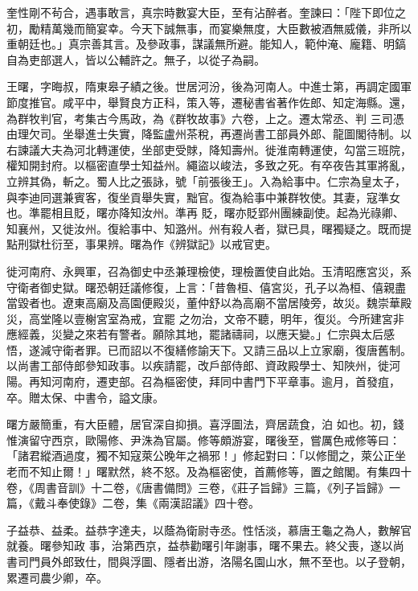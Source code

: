 \begin{pinyinscope}
 奎性剛不茍合，遇事敢言，真宗時數宴大臣，至有沾醉者。奎諫曰：「陛下即位之
 初，勵精萬幾而簡宴幸。今天下誠無事，而宴樂無度，大臣數被酒無威儀，非所以重朝廷也。」真宗善其言。及參政事，謀議無所避。能知人，範仲淹、龐籍、明鎬自為吏部選人，皆以公輔許之。無子，以從子為嗣。



 王曙，字晦叔，隋東皋子績之後。世居河汾，後為河南人。中進士第，再調定國軍節度推官。咸平中，舉賢良方正科，策入等，遷秘書省著作佐郎、知定海縣。還，為群牧判官，考集古今馬政，為《群牧故事》六卷，上之。遷太常丞、判
 三司憑由理欠司。坐舉進士失實，降監盧州茶稅，再遷尚書工部員外郎、龍圖閣待制。以右諫議大夫為河北轉運使，坐部吏受賕，降知壽州。徙淮南轉運使，勾當三班院，權知開封府。以樞密直學士知益州。繩盜以峻法，多致之死。有卒夜告其軍將亂，立辨其偽，斬之。蜀人比之張詠，號「前張後王」。入為給事中。仁宗為皇太子，與李迪同選兼賓客，復坐貢舉失實，黜官。復為給事中兼群牧使。其妻，寇準女也。準罷相且貶，曙亦降知汝州。準再
 貶，曙亦貶郢州團練副使。起為光祿卿、知襄州，又徙汝州。復給事中、知潞州。州有殺人者，獄已具，曙獨疑之。既而提點刑獄杜衍至，事果辨。曙為作《辨獄記》以戒官吏。



 徙河南府、永興軍，召為御史中丞兼理檢使，理檢置使自此始。玉清昭應宮災，系守衛者御史獄。曙恐朝廷議修復，上言：「昔魯桓、僖宮災，孔子以為桓、僖親盡當毀者也。遼東高廟及高園便殿災，董仲舒以為高廟不當居陵旁，故災。魏崇華殿災，高堂隆以壹榭宮室為戒，宜罷
 之勿治，文帝不聽，明年，復災。今所建宮非應經義，災變之來若有警者。願除其地，罷諸禱祠，以應天變。」仁宗與太后感悟，遂減守衛者罪。已而詔以不復繕修諭天下。又請三品以上立家廟，復唐舊制。以尚書工部侍郎參知政事。以疾請罷，改戶部侍郎、資政殿學士、知陜州，徙河陽。再知河南府，遷吏部。召為樞密使，拜同中書門下平章事。逾月，首發疽，卒。贈太保、中書令，謚文康。



 曙方嚴簡重，有大臣體，居官深自抑損。喜浮圖法，齊居蔬食，泊
 如也。初，錢惟演留守西京，歐陽修、尹洙為官屬。修等頗游宴，曙後至，嘗厲色戒修等曰：「諸君縱酒過度，獨不知寇萊公晚年之禍邪！」修起對曰：「以修聞之，萊公正坐老而不知止爾！」曙默然，終不怒。及為樞密使，首薦修等，置之館閣。有集四十卷，《周書音訓》十二卷，《唐書備問》三卷，《莊子旨歸》三篇，《列子旨歸》一篇，《戴斗奉使錄》二卷，集《兩漢詔議》四十卷。



 子益恭、益柔。益恭字達夫，以蔭為衛尉寺丞。性恬淡，慕唐王龜之為人，數解官就養。曙參知政
 事，治第西京，益恭勸曙引年謝事，曙不果去。終父喪，遂以尚書司門員外郎致仕，間與浮圖、隱者出游，洛陽名園山水，無不至也。以子登朝，累遷司農少卿，卒。




\end{pinyinscope}
